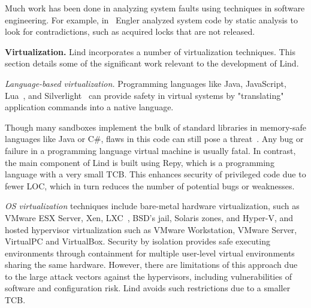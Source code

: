 Much work has been done in analyzing system faults using techniques in
software engineering. For example,
in~\cite{engler2001bugs} Engler analyzed system code by static analysis
to look for contradictions, such as acquired locks that are
not released.

\textbf{Virtualization.}
Lind incorporates a number of virtualization techniques. This section details some
of the significant work relevant to the development of Lind.

\textit{Language-based virtualization.}
Programming languages like Java, JavaScript, Lua~\cite{Lua}, and
Silverlight~\cite{Silverlight} can provide safety in virtual systems by
"translating" application commands into a native language.

Though many sandboxes implement the bulk of standard libraries in
memory-safe languages like Java or C\#, flaws in this code can
still pose a threat~\cite{JavaBugs, Java-Lessons}.
Any bug or failure in a programming language virtual
machine is usually fatal. In contrast, the main component of Lind 
is built using Repy, which is a programming language with a very small TCB. 
This enhances security of privileged code due to fewer LOC, which in
turn reduces the number of potential bugs or weaknesses. 

\textit{OS virtualization}
techniques include
bare-metal hardware virtualization, such as VMware ESX Server, Xen,
LXC~\cite{LXC}, BSD's jail, Solaris zones, and Hyper-V, and
hosted hypervisor virtualization such as VMware
Workstation, VMware Server, VirtualPC and VirtualBox.
Security by isolation \cite{Qubes, Overshadow, SecureVM, HypSec}
provides safe executing environments through containment for multiple
user-level virtual environments sharing the same hardware.
However, there are limitations of this approach due to
the large attack vectors against the hypervisors, including
vulnerabilities of software and configuration risk. Lind avoids such restrictions due to a smaller TCB.


